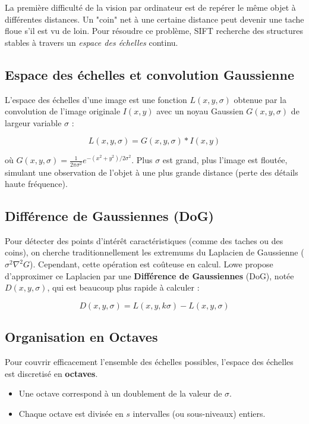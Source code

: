 \documentclass[a4paper,12pt]{report}
\begin{document}
La première difficulté de la vision par ordinateur est de repérer le même objet à différentes distances. Un "coin" net à une certaine distance peut devenir une tache floue s'il est vu de loin. Pour résoudre ce problème, SIFT recherche des structures stables à travers un \textit{espace des échelles} continu.

\subsection{Espace des échelles et convolution Gaussienne}
L'espace des échelles d'une image est une fonction $L(x,y,\sigma)$ obtenue par la convolution de l'image originale $I(x,y)$ avec un noyau Gaussien $G(x,y,\sigma)$ de largeur variable $\sigma$ :

\begin{equation}
    L(x,y,\sigma) = G(x,y,\sigma) * I(x,y)
\end{equation}

où $G(x,y,\sigma) = \frac{1}{2\pi\sigma^2}e^{-(x^2+y^2)/2\sigma^2}$. Plus $\sigma$ est grand, plus l'image est floutée, simulant une observation de l'objet à une plus grande distance (perte des détails haute fréquence).

\subsection{Différence de Gaussiennes (DoG)}
Pour détecter des points d'intérêt caractéristiques (comme des taches ou des coins), on cherche traditionnellement les extremums du Laplacien de Gaussienne ($\sigma^2 \nabla^2 G$). Cependant, cette opération est coûteuse en calcul.
Lowe propose d'approximer ce Laplacien par une \textbf{Différence de Gaussiennes} (DoG), notée $D(x,y,\sigma)$, qui est beaucoup plus rapide à calculer :

\begin{equation}
    D(x,y,\sigma) = L(x,y,k\sigma) - L(x,y,\sigma)
\end{equation}

\subsection{Organisation en Octaves}
Pour couvrir efficacement l'ensemble des échelles possibles, l'espace des échelles est discretisé en \textbf{octaves}.
\begin{itemize}
    \item Une octave correspond à un doublement de la valeur de $\sigma$.
    \item Chaque octave est divisée en $s$ intervalles (ou sous-niveaux) entiers.
\end{itemize}
\end{document}
